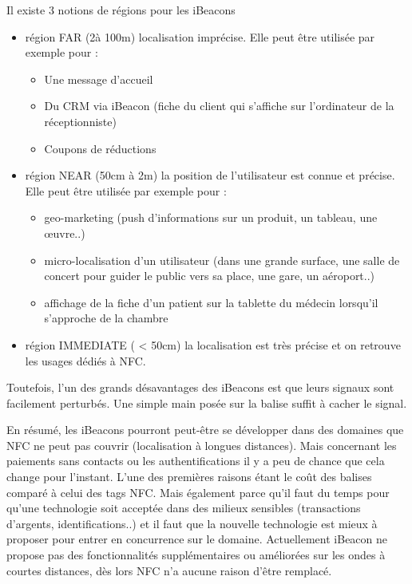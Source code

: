 \documentclass[francais,12pt]{article}
\begin{document}
	Il existe 3 notions de régions pour les iBeacons
	\begin{itemize}
		\item région FAR (2à 100m) localisation imprécise. Elle peut être utilisée par exemple pour :
		\begin{itemize}
			\item Une message d'accueil
			\item Du CRM via iBeacon (fiche du client qui s'affiche sur l'ordinateur de la réceptionniste)
			\item Coupons de réductions
		\end{itemize}
		\item région NEAR (50cm à 2m) la position de l'utilisateur est connue et précise. Elle peut être utilisée par exemple pour :
		\begin{itemize}
			\item geo-marketing (push d'informations sur un produit, un tableau, une œuvre..)
			\item micro-localisation d'un utilisateur (dans une grande surface, une salle de concert pour guider le public vers sa place, une gare, un aéroport..)
			\item affichage de la fiche d'un patient sur la tablette du médecin lorsqu'il s'approche de la chambre
		\end{itemize}
		\item région IMMEDIATE ( < 50cm) la localisation est très précise et on retrouve les usages dédiés à NFC.
	\end{itemize}

		Toutefois, l'un des grands désavantages des iBeacons est que leurs signaux sont facilement perturbés. Une simple main posée sur la balise suffit à cacher le signal. 
	
		En résumé, les iBeacons pourront peut-être se développer dans des domaines que NFC ne peut pas couvrir (localisation à longues distances). Mais concernant les paiements sans contacts ou les authentifications il y a peu de chance que cela change pour l'instant.
		L’une des premières raisons étant le coût des balises comparé à celui des tags NFC. Mais également parce qu’il faut du temps pour qu’une technologie soit acceptée dans des milieux sensibles (transactions d’argents, identifications..) et il faut que la nouvelle technologie est mieux à proposer pour entrer en concurrence sur le domaine. Actuellement iBeacon ne propose pas des fonctionnalités supplémentaires ou améliorées sur les ondes à courtes distances, dès lors NFC n’a aucune raison d’être remplacé.
	
\end{document}
